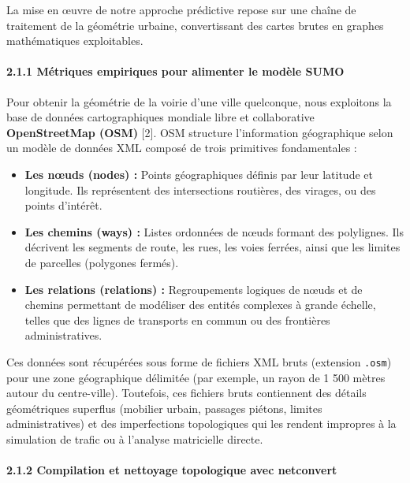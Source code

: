 \documentclass[10pt, a4paper]{article}
\providecommand{\tightlist}{}
\begin{document}
La mise en œuvre de notre approche prédictive repose sur une chaîne de
traitement de la géométrie urbaine, convertissant des cartes brutes en
graphes mathématiques exploitables.

\paragraph{2.1.1 Métriques empiriques pour alimenter le modèle
SUMO}\label{muxe9triques-empiriques-pour-alimenter-le-moduxe8le-sumo}

Pour obtenir la géométrie de la voirie d'une ville quelconque, nous
exploitons la base de données cartographiques mondiale libre et
collaborative \textbf{OpenStreetMap (OSM)} {[}2{]}. OSM structure
l'information géographique selon un modèle de données XML composé de
trois primitives fondamentales :

\begin{itemize}
\tightlist
\item
  \textbf{Les nœuds (nodes) :} Points géographiques définis par leur
  latitude et longitude. Ils représentent des intersections routières,
  des virages, ou des points d'intérêt.
\item
  \textbf{Les chemins (ways) :} Listes ordonnées de nœuds formant des
  polylignes. Ils décrivent les segments de route, les rues, les voies
  ferrées, ainsi que les limites de parcelles (polygones fermés).
\item
  \textbf{Les relations (relations) :} Regroupements logiques de nœuds
  et de chemins permettant de modéliser des entités complexes à grande
  échelle, telles que des lignes de transports en commun ou des
  frontières administratives.
\end{itemize}

Ces données sont récupérées sous forme de fichiers XML bruts (extension
\texttt{.osm}) pour une zone géographique délimitée (par exemple, un
rayon de 1 500 mètres autour du centre-ville). Toutefois, ces fichiers
bruts contiennent des détails géométriques superflus (mobilier urbain,
passages piétons, limites administratives) et des imperfections
topologiques qui les rendent impropres à la simulation de trafic ou à
l'analyse matricielle directe.

\paragraph{2.1.2 Compilation et nettoyage topologique avec
netconvert}\label{compilation-et-nettoyage-topologique-avec-netconvert}
\end{document}
